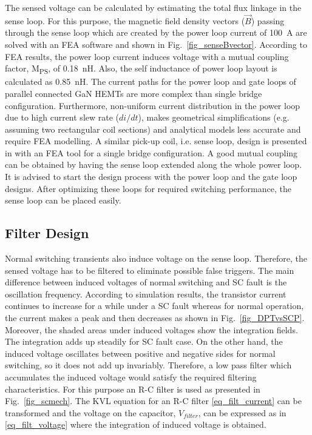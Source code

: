 \documentclass[journal]{IEEEtran}
\begin{document}
The sensed voltage can be calculated by estimating the total flux linkage in the sense loop. For this purpose, the magnetic field density vectors ($\vec{B}$) passing through the sense loop which are created by the power loop current of 100~A are solved with an FEA software and shown in Fig.~\ref{fig_senseBvector}. According to FEA results, the power loop current induces voltage with a mutual coupling factor, M\textsubscript{PS}, of 0.18~nH. Also, the self inductance of power loop layout is calculated as 0.85~nH. The current paths for the power loop and gate loops of parallel connected GaN HEMTs are more complex than single bridge configuration. Furthermore, non-uniform current distribution in the power loop due to high current slew rate ($di/dt$), makes geometrical simplifications (e.g. assuming two rectangular coil sections) and analytical models less accurate and require FEA modelling. A similar pick-up coil, i.e. sense loop, design is presented in \cite{Wang2017d} with an FEA tool for a single bridge configuration. A good mutual coupling can be obtained by having the sense loop extended along the whole power loop. It is advised to start the design process with the power loop and the gate loop designs. After optimizing these loops for required switching performance, the sense loop can be placed easily.

\subsection{Filter Design}
\label{sec_filterdesign}
Normal switching transients also induce voltage on the sense loop. Therefore, the sensed voltage has to be filtered to eliminate possible false triggers. The main difference between induced voltages of normal switching and SC fault is the oscillation frequency. According to simulation results, the transistor current continues to increase for a while under a SC fault whereas for normal operation, the current makes a peak and then decreases as shown in Fig.~\ref{fig_DPTvsSCP}. Moreover, the shaded areas under induced voltages show the integration fields. The integration adds up steadily for SC fault case. On the other hand, the induced voltage oscillates between positive and negative sides for normal switching, so it does not add up invariably. Therefore, a low pass filter which accumulates the induced voltage would satisfy the required filtering characteristics. For this purpose an R-C filter is used as presented in Fig.~\ref{fig_scmech}. The KVL equation for an R-C filter \eqref{eq_filt_current} can be transformed and the voltage on the capacitor, $V_{filter}$, can be expressed as in \eqref{eq_filt_voltage} where the integration of induced voltage is obtained.
\end{document}

